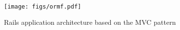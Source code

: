 


\begin{figure}[h]
    \centering
    \texttt{[image: figs/ormf.pdf]}
    \vspace{0.05in}
    \caption{Rails application architecture based on the MVC pattern}
    \label{fig:ormf}
    \vspace{-0.2in}
\end{figure}

